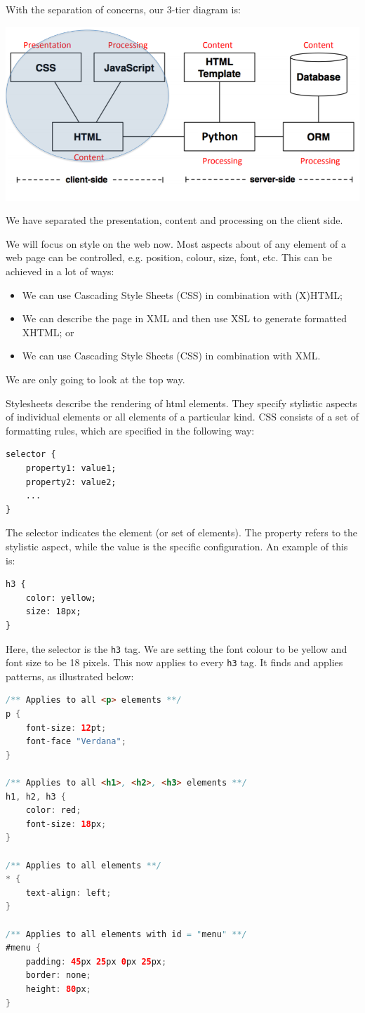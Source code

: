 \documentclass[a4paper, openany]{memoir}
\begin{document}
With the separation of concerns, our 3-tier diagram is:
\begin{center}
    \includegraphics[scale=0.6]{src/L10I5.PNG}
\end{center}
We have separated the presentation, content and processing on the client side. 

We will focus on style on the web now. Most aspects about of any element of a web page can be controlled, e.g. position, colour, size, font, etc. This can be achieved in a lot of ways:
\begin{itemize}
    \item We can use Cascading Style Sheets (CSS) in combination with (X)HTML;
    \item We can describe the page in XML and then use XSL to generate formatted XHTML; or
    \item We can use Cascading Style Sheets (CSS) in combination with XML.
\end{itemize}
We are only going to look at the top way.

Stylesheets describe the rendering of html elements. They specify stylistic aspects of individual elements or all elements of a particular kind. CSS consists of a set of formatting rules, which are specified in the following way:
\begin{lstlisting}
selector {
    property1: value1;
    property2: value2;
    ...
}
\end{lstlisting}
The selector indicates the element (or set of elements). The property refers to the stylistic aspect, while the value is the specific configuration. An example of this is:
\begin{lstlisting}
h3 {
    color: yellow;
    size: 18px;
}
\end{lstlisting}
Here, the selector is the \texttt{h3} tag. We are setting the font colour to be yellow and font size to be 18 pixels. This now applies to every \texttt{h3} tag. It finds and applies patterns, as illustrated below:
\begin{lstlisting}[language=java]
/** Applies to all <p> elements **/
p {
    font-size: 12pt;
    font-face "Verdana";
}

/** Applies to all <h1>, <h2>, <h3> elements **/
h1, h2, h3 {
    color: red;
    font-size: 18px;
}

/** Applies to all elements **/
* {
    text-align: left;
}

/** Applies to all elements with id = "menu" **/
#menu {
    padding: 45px 25px 0px 25px;
    border: none;
    height: 80px;
}
\end{lstlisting}
\end{document}
